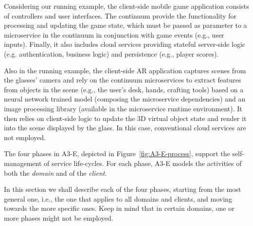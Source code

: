 Considering our running example, the client-side mobile game application consists of controllers and user interfaces. The continuum provide the functionality for processing and updating the game state, which must be passed as parameter to a microservice in the continuum in conjunction with game events (e.g., user inputs). Finally, it also includes cloud services providing stateful server-side logic (e.g. authentication, business logic) and persistence (e.g., player scores). 

Also in the running example, the client-side AR application captures scenes from the glasses' camera and rely on the continuum microservices to extract features from objects in the scene (e.g., the user's desk, hands, crafting tools) based on a neural network trained model (composing the microservice dependencies) and an image processing library (available in the microservice runtime environment). It then relies on client-side logic to update the 3D virtual object state and render it into the scene displayed by the glass. In this case, conventional cloud services are not employed.



The four phases in A3-E, depicted in Figure~\ref{fig:A3-E-process}, support the self-management of service life-cycles. For each phase, A3-E  models the activities of both the \textit{domain} and of the \textit{client}. 

In this section we shall describe each of the four phases, starting from the most general one, i.e., the one that applies to all domains and clients, and moving towards the more specific ones. Keep in mind that in certain domains, one or more phases might not be employed.

